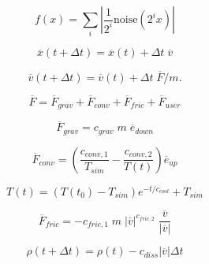 \documentclass[11pt]{article}
\begin{document}
\[f(x)=\sum_{i}\left|\frac{1}{2^{i}}\textrm{noise}\left(2^{i}x\right)\right|\]

\[\overline{x}(t+\Delta t) = \overline{x}(t)+\Delta t\; \overline{v}\]

\[\overline{v}(t+\Delta t) = \overline{v}(t)+\Delta t\; \overline{F}/m.\]

\[\overline{F}=\overline{F}_{grav}+\overline{F}_{conv}+\overline{F}_{fric}+\overline{F}_{user}\]

\[\overline{F}_{grav}=c_{grav}\;m\;\overline{e}_{down}\]

\[\overline{F}_{conv}=\left(\frac{c_{conv,1}}{T_{sim}}-\frac{c_{conv,2}}{T(t)}\right) \overline{e}_{up}\]

\[T(t)=(T(t_0)-T_{sim})e^{-t/c_{cool}}+T_{sim}\]

\[\overline{F}_{fric}=-c_{fric,1}\;m\;|\overline{v}|^{c_{fric,2}}\;\frac{\overline{v}}{|\overline{v}|}\]

\[\rho(t+\Delta t) = \rho(t)-c_{diss}|\overline{v}|\Delta t\]
\end{document}
